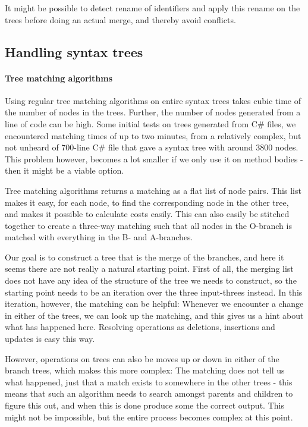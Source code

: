 \documentclass[11pt]{article}
\begin{document}
It might be possible to detect rename of identifiers and apply this rename on the trees before doing an actual merge, and thereby avoid conflicts.

\subsection{Handling syntax trees}
\paragraph{Tree matching algorithms} Using regular tree matching algorithms on entire syntax trees takes cubic time of the number of nodes in the trees. Further, the number of nodes generated from a line of code can be high. Some initial tests on trees generated from C\# files, we encountered matching times of up to two minutes, from a relatively complex, but not unheard of 700-line C\# file that gave a syntax tree with around 3800 nodes. This problem however, becomes a lot smaller if we only use it on method bodies - then it might be a viable option.

Tree matching algorithms returns a matching as a flat list of node pairs. This list makes it easy, for each node, to find the corresponding node in the other tree, and makes it possible to calculate costs easily. This can also easily be stitched together to create a three-way matching such that all nodes in the O-branch is matched with everything in the B- and A-branches.

Our goal is to construct a tree that is the merge of the branches, and here it seems there are not really a natural starting point. First of all, the merging list does not have any idea of the structure of the tree we needs to construct, so the starting point needs to be an iteration over the three input-threes instead. In this iteration, however, the matching can be helpful: Whenever we encounter a change in either of the trees, we can look up the matching, and this gives us a hint about what has happened here. Resolving operations as deletions, insertions and updates is easy this way.

However, operations on trees can also be moves up or down in either of the branch trees, which makes this more complex: The matching does not tell us what happened, just that a match exists to somewhere in the other trees - this means that such an algorithm needs to search amongst parents and children to figure this out, and when this is done produce some the correct output. This might not be impossible, but the entire process becomes complex at this point. 
\end{document}
